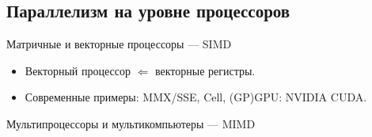 \subsection {Параллелизм на уровне процессоров}

\begin{frame}{Матричные и векторные процессоры — SIMD}

\pause
\begin{itemize}
    \item Векторный процессор $\Longleftarrow$ векторные регистры.
    \item \pause Современные примеры: \pause MMX/SSE, \pause Cell, \pause (GP)GPU: NVIDIA CUDA.
\end{itemize}


\end{frame}


\begin{frame}{Мультипроцессоры и мультикомпьютеры — MIMD}
\end{frame}


